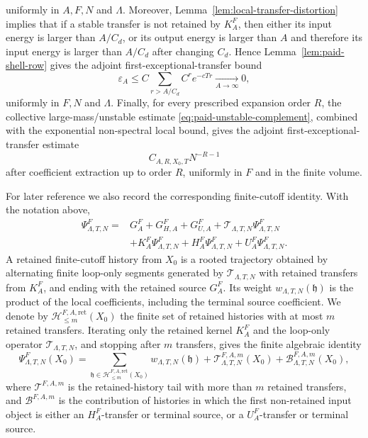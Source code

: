 \documentclass[11pt,a4paper,reqno]{amsart}
\theoremstyle{definition}
\theoremstyle{remark}
\begin{document}
uniformly in $A,F,N$ and $\Lambda$.  Moreover, Lemma~\ref{lem:local-transfer-distortion} implies that if a stable transfer is not retained by $K_A^{F}$, then either its input energy is larger than $A/C_d$, or its output energy is larger than $A$ and therefore its input energy is larger than $A/C_d$ after changing $C_d$.  Hence Lemma~\ref{lem:paid-shell-row} gives the adjoint first-exceptional-transfer bound
\begin{equation}
\label{eq:stable-exceptional-kernel-bound}
\varepsilon_A\le C\sum_{r>A/C_d} C^r e^{-cTr}
\xrightarrow[A\to\infty]{}0,
\end{equation}
uniformly in $F,N$ and $\Lambda$.  Finally, for every prescribed expansion order $R$, the collective large-mass/unstable estimate \eqref{eq:paid-unstable-complement}, combined with the exponential non-spectral local bound, gives the adjoint first-exceptional-transfer estimate
\begin{equation}
\label{eq:unstable-exceptional-kernel-bound}
C_{A,R,X_0,T}N^{-R-1}
\end{equation}
after coefficient extraction up to order $R$, uniformly in $F$ and in the finite volume.

For later reference we also record the corresponding finite-cutoff identity.  With the notation above,
\begin{equation}
\label{eq:finite-cutoff-rooted-equation}
\begin{aligned}
\Psi^F_{\Lambda,T,N}
={}&G_A^F+G_{H,A}^F+G_{U,A}^F
+\mathcal T_{\Lambda,T,N}\Psi^F_{\Lambda,T,N}\\
&+K_A^F\Psi^F_{\Lambda,T,N}
+H_A^F\Psi^F_{\Lambda,T,N}
+U_A^F\Psi^F_{\Lambda,T,N}.
\end{aligned}
\end{equation}
A retained finite-cutoff history from $X_0$ is a rooted trajectory obtained by alternating finite loop-only segments generated by $\mathcal T_{\Lambda,T,N}$ with retained transfers from $K_A^F$, and ending with the retained source $G_A^F$.  Its weight $w_{\Lambda,T,N}(\mathfrak h)$ is the product of the local coefficients, including the terminal source coefficient.  We denote by $\mathcal H^{F,A,\mathrm{ret}}_{\le m}(X_0)$ the finite set of retained histories with at most $m$ retained transfers.  Iterating only the retained kernel $K_A^F$ and the loop-only operator $\mathcal T_{\Lambda,T,N}$, and stopping after $m$ transfers, gives the finite algebraic identity
\begin{equation}
\label{eq:finite-cutoff-history-identity}
\Psi^F_{\Lambda,T,N}(X_0)
=
\sum_{\mathfrak h\in\mathcal H^{F,A,\mathrm{ret}}_{\le m}(X_0)}
w_{\Lambda,T,N}(\mathfrak h)
+
\mathcal T^{F,A,m}_{\Lambda,T,N}(X_0)
+
\mathcal B^{F,A,m}_{\Lambda,T,N}(X_0),
\end{equation}
where $\mathcal T^{F,A,m}$ is the retained-history tail with more than $m$ retained transfers, and $\mathcal B^{F,A,m}$ is the contribution of histories in which the first non-retained input object is either an $H_A^F$-transfer or terminal source, or a $U_A^F$-transfer or terminal source.
\end{document}
